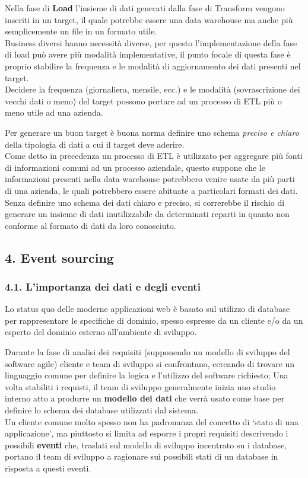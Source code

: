 \documentclass[]{article}
\begin{document}
Nella fase di \textbf{Load} l'insieme di dati generati dalla fase di
Transform vengono inseriti in un target, il quale potrebbe essere una
data warehouse ma anche più semplicemente un file in un formato utile.\\
Business diversi hanno necessità diverse, per questo l'implementazione
della fase di load può avere più modalità implementative, il punto
focale di questa fase è proprio stabilire la frequenza e le modalità di
aggiornamento dei dati presenti nel target.\\
Decidere la frequenza (giornaliera, mensile, ecc.) e le modalità
(sovrascrizione dei vecchi dati o meno) del target possono portare ad un
processo di ETL più o meno utile ad una azienda.

Per generare un buon target è buona norma definire uno schema
\emph{preciso e chiaro} della tipologia di dati a cui il target deve
aderire.\\
Come detto in precedenza un processo di ETL è utilizzato per aggregare
più fonti di informazioni comuni ad un processo aziendale, questo
suppone che le informazioni presenti nella data warehouse potrebbero
venire usate da più parti di una azienda, le quali potrebbero essere
abituate a particolari formati dei dati.\\
Senza definire uno schema dei dati chiaro e preciso, si correrebbe il
rischio di generare un insieme di dati inutilizzabile da determinati
reparti in quanto non conforme al formato di dati da loro conosciuto.

\newpage

\hypertarget{event-sourcing}{\subsection{4. Event
sourcing}\label{event-sourcing}}

\subsubsection{4.1. L'importanza dei dati e degli
eventi}\label{limportanza-dei-dati-e-degli-eventi}

Lo status quo delle moderne applicazioni web è basato sul utilizzo di
database per rappresentare le specifiche di dominio, spesso espresse da
un cliente e/o da un esperto del dominio esterno all'ambiente di
sviluppo.

Durante la fase di analisi dei requisiti (supponendo un modello di
sviluppo del software agile) cliente e team di sviluppo si confrontano,
cercando di trovare un linguaggio comune per definire la logica e
l'utilizzo del software richiesto; Una volta stabiliti i requisti, il
team di sviluppo generalmente inizia uno studio interno atto a produrre
un \textbf{modello dei dati} che verrà usato come base per definire lo
schema dei database utilizzati dal sistema.\\
Un cliente comune molto spesso non ha padronanza del concetto di `stato
di una applicazione', ma piuttosto si limita ad esporre i propri
requisiti descrivendo i possibili \textbf{eventi} che, traslati sul
modello di sviluppo incentrato su i database, portano il team di
sviluppo a ragionare sui possibili stati di un database in risposta a
questi eventi.
\end{document}
